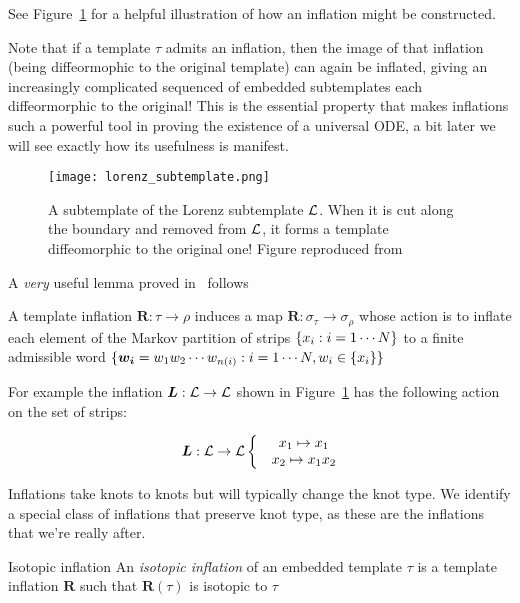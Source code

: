\documentclass[paper.tex]{subfiles}
\begin{document}
See Figure~\ref{fig:lorenz_subtemplate} for a helpful illustration of how an inflation might be constructed.



Note that if a template $\tau$ admits an inflation, then the image of that inflation (being diffeormophic to the original template) can again be inflated, giving an increasingly complicated sequenced of embedded
subtemplates each diffeormorphic to the original! This is the essential property that makes inflations such a powerful tool in proving the existence of a universal ODE, a bit later
we will see exactly how its usefulness is manifest.

\begin{figure}[h]
  \centering
  \texttt{[image: lorenz\_subtemplate.png]}
  \caption{A subtemplate of the Lorenz subtemplate $\mathcal{L}$. When it is cut along the boundary and removed from $\mathcal{L}$, it forms a template diffeomorphic to the original one! Figure reproduced from~\cite{knottyode}}\label{fig:lorenz_subtemplate}
\end{figure}

A \emph{very} useful lemma proved in~\cite{knottyode} follows


\begin{lemma}
  A template inflation $\bm{R}: \tau \to \rho$ induces a map $\bm{R}: \sigma_\tau \to \sigma_\rho$ whose action is to inflate each element of the Markov partition of strips $\{ x_i : i = 1\cdots N \}$ to a finite
  admissible word $\{ \bm{w_i} = w_1 w_2 \cdots w_{n(i)} : i = 1 \cdots N, w_i \in \{ x_i \} \}$
\end{lemma}

For example the inflation $\bm{L} : \mathcal{L} \to \mathcal{L}$ shown in Figure~\ref{fig:lorenz_subtemplate} has the following action on the set of strips:

\begin{equation}
  \bm{L} : \mathcal{L} \to \mathcal{L} \left\{ \begin{matrix} & x_1 \mapsto x_1 \\ & x_2 \mapsto x_1 x_2 \end{matrix}\right.
\end{equation}

Inflations take knots to knots but will typically change the knot type. We identify a special class of inflations that preserve knot type, as these are the inflations that we're really after.


\begin{definition}{Isotopic inflation}
  An \emph{isotopic inflation} of an embedded template $\tau$ is a template inflation $\bm{R}$ such that $\bm{R}(\tau)$ is isotopic to $\tau$
\end{definition}
\end{document}
